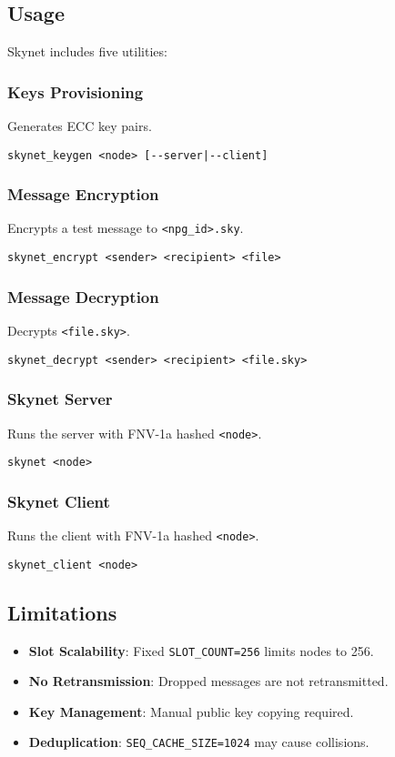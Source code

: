 \documentclass{article}
\begin{document}
\subsection{Usage}
Skynet includes five utilities:

\subsubsection*{Keys Provisioning}
Generates ECC key pairs.
\begin{lstlisting}
skynet_keygen <node> [--server|--client]
\end{lstlisting}

\subsubsection*{Message Encryption}
Encrypts a test message to \texttt{<npg\_id>.sky}.
\begin{lstlisting}
skynet_encrypt <sender> <recipient> <file>
\end{lstlisting}

\subsubsection*{Message Decryption}
Decrypts \texttt{<file.sky>}.
\begin{lstlisting}
skynet_decrypt <sender> <recipient> <file.sky>
\end{lstlisting}

\subsubsection*{Skynet Server}
Runs the server with FNV-1a hashed \texttt{<node>}.
\begin{lstlisting}
skynet <node>
\end{lstlisting}

\subsubsection*{Skynet Client}
Runs the client with FNV-1a hashed \texttt{<node>}.
\begin{lstlisting}
skynet_client <node>
\end{lstlisting}

\subsection{Limitations}
\begin{itemize}
    \item \textbf{Slot Scalability}: Fixed \texttt{SLOT\_COUNT=256} limits nodes to 256.
    \item \textbf{No Retransmission}: Dropped messages are not retransmitted.
    \item \textbf{Key Management}: Manual public key copying required.
    \item \textbf{Deduplication}: \texttt{SEQ\_CACHE\_SIZE=1024} may cause collisions.
\end{itemize}
\end{document}
